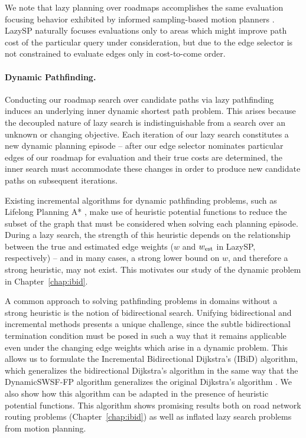 We note that lazy planning over roadmaps accomplishes
the same evaluation focusing behavior exhibited by
informed sampling-based motion planners
\citep{gammell2014informedrrtstar, gammell2015bitstar}.
LazySP naturally focuses evaluations only to areas which might improve
path cost of the particular query under consideration,
but due to the edge selector is not constrained to evaluate edges
only in cost-to-come order.

\paragraph{Dynamic Pathfinding.}
Conducting our roadmap search over candidate paths via lazy
pathfinding
induces an underlying inner dynamic shortest path problem.
This arises because the decoupled nature of lazy search
is indistinguishable from a search over an unknown or changing objective.
Each iteration of our lazy search constitutes a new dynamic planning
episode --
after our edge selector nominates particular edges of our roadmap
for evaluation and their true costs are determined,
the inner search must accommodate these changes in order to produce
new candidate paths on subsequent iterations.

Existing incremental algorithms for dynamic pathfinding problems,
such as Lifelong Planning A* \citep{koenig2004lpastar},
make use of heuristic potential functions to reduce the subset of
the graph that must be considered when solving each planning episode.
During a lazy search,
the strength of this heuristic depends on
the relationship between the true and estimated edge weights
($w$ and $w_{\mbox{\scriptsize est}}$ in LazySP, respectively)
-- and in many cases, a strong lower bound on $w$,
and therefore a strong heuristic, may not exist.
This motivates our study of the dynamic problem
in Chapter~\ref{chap:ibid}.

A common approach to solving pathfinding problems in domains without
a strong heuristic is the notion of bidirectional search.
Unifying bidirectional and incremental methods presents a unique
challenge,
since the subtle bidirectional termination condition must be
posed in such a way that it remains applicable even under the
changing edge weights which arise in a dynamic problem.
This allows us to formulate the Incremental Bidirectional Dijkstra's
(IBiD) algorithm,
which generalizes the bidirectional Dijkstra's algorithm
\citep{goldberg2005spexternalmemory}
in the same way that the DynamicSWSF-FP algorithm
\citep{ramalingam1996dynamicswsffp} generalizes the original
Dijkstra's algorithm \citep{dijkstra1959anote}.
We also show how this algorithm can be adapted in the presence of
heuristic potential functions.
This algorithm shows promising results both on road network routing
problems (Chapter~\ref{chap:ibid})
as well as inflated lazy search problems from motion planning.

